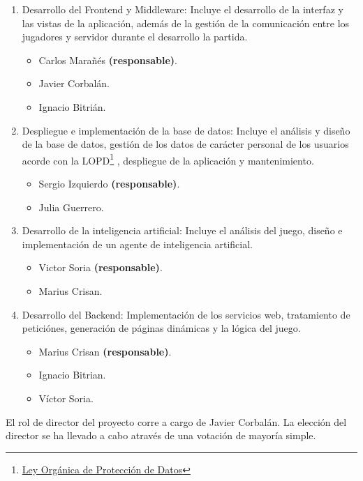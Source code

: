 \begin{enumerate}
\item Desarrollo del Frontend y Middleware: Incluye el desarrollo de la interfaz y las vistas de la aplicación, además de la gestión de la comunicación entre los jugadores y servidor durante el desarrollo la partida.
	\begin{itemize}
    \item Carlos Marañés \textbf{(responsable)}.
		\item Javier Corbalán.
    	\item Ignacio Bitrián.
	\end{itemize}
\newpage
\item Despliegue e implementación de la base de datos: Incluye el análisis y diseño de la base de datos, gestión de los datos de carácter personal de los usuarios acorde con la LOPD\footnote{\href{http://www.agpd.es/portalwebAGPD/canaldocumentacion/informes_juridicos/reglamento_lopd/index-ides-idphp.php}{Ley Orgánica de Protección de Datos}} , despliegue de la aplicación y mantenimiento.
	\begin{itemize}
    	\item Sergio Izquierdo \textbf{(responsable)}.
        \item Julia Guerrero.
    \end{itemize}
\item Desarrollo de la inteligencia artificial: Incluye el análisis del juego, diseño e implementación de un agente de inteligencia artificial.
	\begin{itemize}
    	\item Victor Soria \textbf{(responsable)}.
        \item Marius Crisan.
    \end{itemize}
\item Desarrollo del Backend: Implementación de los servicios web, tratamiento de peticiónes, generación de páginas dinámicas y la lógica del juego.
	\begin{itemize}
   		\item Marius Crisan \textbf{(responsable)}.
    	\item Ignacio Bitrian.
        \item Víctor Soria.
    \end{itemize}
\end{enumerate}

El rol de director del proyecto corre a cargo de Javier Corbalán. La elección del director se ha llevado a cabo através de una votación de mayoría simple.
